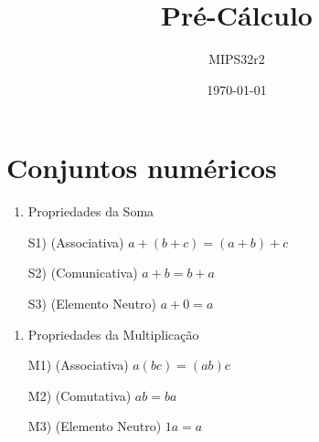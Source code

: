\documentclass[a4paper, 12pt]{article}
\begin{document}
\title{\textbf{Pré-Cálculo}}
\author{MIPS32r2}
\date{\today} %

\maketitle %

\section{Conjuntos numéricos}
  \begin{enumerate}
    \item Propriedades da Soma

    S1) (Associativa) $a + (b + c) = (a + b) + c$

    S2) (Comunicativa) $a + b = b +a$

    S3) (Elemento Neutro) $a + 0 = a$ %

  \end{enumerate}

\begin{enumerate} 
  \item Propriedades da Multiplicação
  
    M1) (Associativa) $a(bc) = (ab)c$

    M2) (Comutativa) $ab = ba$ %

    M3) (Elemento Neutro) $1a = a$

  \end{enumerate}
\end{document}
